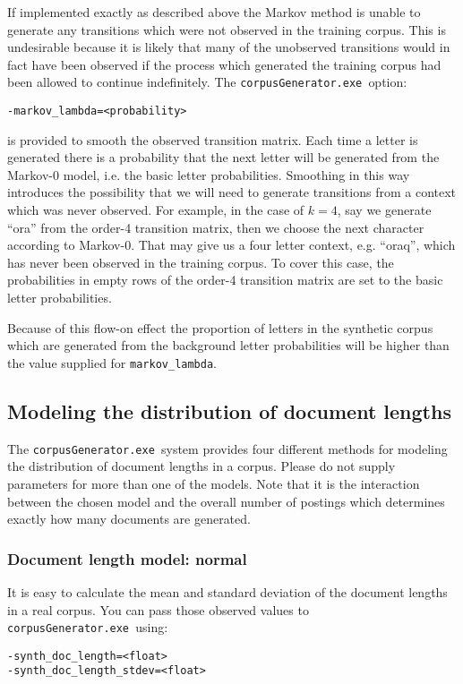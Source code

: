 \documentclass{article}
\newcommand{\gac}{\texttt{corpusGenerator.exe~}}
\begin{document}
If implemented exactly as described above the Markov method is unable to
generate any transitions which were not observed in the training
corpus.  This is undesirable because it is likely that many of the
unobserved transitions would in fact have been observed if the process which
generated the training corpus had been allowed to continue indefinitely.
The \gac option:
\begin{verbatim}
-markov_lambda=<probability>
\end{verbatim}
is provided to smooth the observed transition matrix.  Each time a
letter is generated there is a probability that the next letter will
be generated from the Markov-0 model, i.e. the basic letter
probabilities.  Smoothing in this way introduces the possibility that
we will need to generate transitions from a context which was never
observed. For example, in the case of $k = 4$, say we generate ``ora''
from the order-4 transition matrix, then we choose the next character
according to Markov-0. That may give us a four letter context,
e.g. ``oraq'',  which has never been observed in the training corpus.
To cover this case, the probabilities in empty rows of the order-4
transition matrix are set to the basic letter probabilities.

Because of this flow-on effect the proportion of letters in the
synthetic corpus which are generated from the background letter
probabilities will be higher than the value supplied for
\verb|markov_lambda|.

\subsection{Modeling the distribution of document lengths}
The \gac system provides four different methods for modeling the distribution of
document lengths in a corpus. Please do not supply parameters for more
than one of the models.  Note that it is the interaction between
the chosen model and the overall number of postings which determines
exactly how many documents are generated.

\subsubsection{Document length model: normal}
It is easy to calculate the mean and standard deviation of the
document lengths in a real corpus.  You can pass those observed values
to \gac using:

\begin{verbatim}
-synth_doc_length=<float>
-synth_doc_length_stdev=<float>
\end{verbatim}
\end{document}
